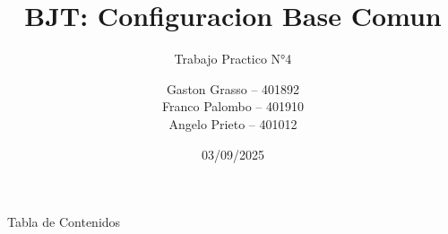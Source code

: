 \documentclass[aspectratio=169]{beamer}
\title{BJT: Configuracion Base Comun}
\subtitle{Trabajo Practico N°4}
\author[Grasso, Palombo, Prieto]{%
  \begin{tabular}{l}
      Gaston Grasso -- 401892 \\
    Franco Palombo -- 401910 \\
      Angelo Prieto -- 401012
  \end{tabular}
}
\institute[UTN - FRC]{Universidad Tecnologica Nacional, Facultad Regional Cordoba}
\date[2025]{03/09/2025}
\begin{document}
\frame{\titlepage}
\begin{frame}{Tabla de Contenidos}
\tableofcontents
\end{frame}





\end{document}
